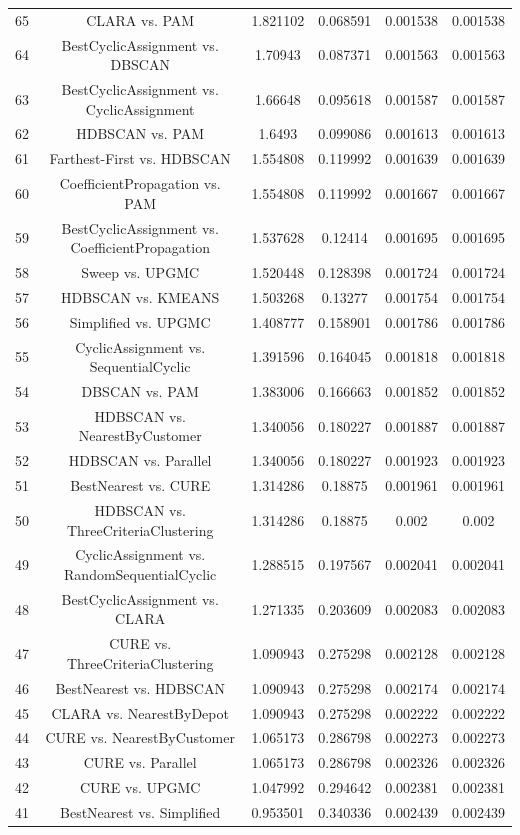 \documentclass[a4paper,10pt]{article}
\begin{document}
\begin{landscape}
\begin{table}[!htp]
\begin{tabular}{cccccc}
65&CLARA vs. PAM&1.821102&0.068591&0.001538&0.001538\\
64&BestCyclicAssignment vs. DBSCAN&1.70943&0.087371&0.001563&0.001563\\
63&BestCyclicAssignment vs. CyclicAssignment&1.66648&0.095618&0.001587&0.001587\\
62&HDBSCAN vs. PAM&1.6493&0.099086&0.001613&0.001613\\
61&Farthest-First vs. HDBSCAN&1.554808&0.119992&0.001639&0.001639\\
60&CoefficientPropagation vs. PAM&1.554808&0.119992&0.001667&0.001667\\
59&BestCyclicAssignment vs. CoefficientPropagation&1.537628&0.12414&0.001695&0.001695\\
58&Sweep vs. UPGMC&1.520448&0.128398&0.001724&0.001724\\
57&HDBSCAN vs. KMEANS&1.503268&0.13277&0.001754&0.001754\\
56&Simplified vs. UPGMC&1.408777&0.158901&0.001786&0.001786\\
55&CyclicAssignment vs. SequentialCyclic&1.391596&0.164045&0.001818&0.001818\\
54&DBSCAN vs. PAM&1.383006&0.166663&0.001852&0.001852\\
53&HDBSCAN vs. NearestByCustomer&1.340056&0.180227&0.001887&0.001887\\
52&HDBSCAN vs. Parallel&1.340056&0.180227&0.001923&0.001923\\
51&BestNearest vs. CURE&1.314286&0.18875&0.001961&0.001961\\
50&HDBSCAN vs. ThreeCriteriaClustering&1.314286&0.18875&0.002&0.002\\
49&CyclicAssignment vs. RandomSequentialCyclic&1.288515&0.197567&0.002041&0.002041\\
48&BestCyclicAssignment vs. CLARA&1.271335&0.203609&0.002083&0.002083\\
47&CURE vs. ThreeCriteriaClustering&1.090943&0.275298&0.002128&0.002128\\
46&BestNearest vs. HDBSCAN&1.090943&0.275298&0.002174&0.002174\\
45&CLARA vs. NearestByDepot&1.090943&0.275298&0.002222&0.002222\\
44&CURE vs. NearestByCustomer&1.065173&0.286798&0.002273&0.002273\\
43&CURE vs. Parallel&1.065173&0.286798&0.002326&0.002326\\
42&CURE vs. UPGMC&1.047992&0.294642&0.002381&0.002381\\
41&BestNearest vs. Simplified&0.953501&0.340336&0.002439&0.002439\\

\end{tabular}
\end{table}
\end{landscape}
\end{document}
